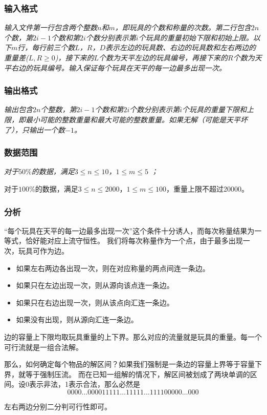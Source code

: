 \subsubsection{输入格式}
{\itshape 
	输入文件第一行包含两个整数$n$和$m$，即玩具的个数和称量的次数。第二行包含$2n$个数，第$2i-1$个数和第$2i$个数分别表示第$i$个玩具的重量初始下限和初始上限。以下$m$行，每行前三个数$L$，$R$，$D$表示左边的玩具数、右边的玩具数和左右两边的重量差($L,R \ge 0$)，接下来的$L$个数为天平左边的玩具编号，再接下来的$R$个数为天平右边的玩具编号。输入保证每个玩具在天平的每一边最多出现一次。
}
\subsubsection{输出格式}
{\itshape 输出包含$2n$个整数，第$2i-1$个数和第$2i$个数分别表示第$i$个玩具的重量下限和上限，即最小可能的整数重量和最大可能的整数重量。如果无解（可能是天平坏了），只输出一个数$-1$。}
\subsubsection{数据范围}
{\itshape
对于$50\%$的数据，满足$3 \le n \le 10$，$1 \le m \le 5$ ；\par
对于$100\%$的数据，满足$3 \le n \le 2000$，$1 \le m \le 100$，重量上限不超过20000。
}
\subsubsection{分析}
“每个玩具在天平的每一边最多出现一次”这个条件十分诱人，而每次称量结果为一等式，恰好能对应上流守恒性。
我们将每次称量作为一个点，由于最多出现一次，玩具可作为边。
\begin{itemize}
\item 如果左右两边各出现一次，则在对应称量的两点间连一条边。
\item 如果只在左边出现一次，则从源向该点连一条边。
\item 如果只在右边出现一次，则从该点向汇连一条边。
\item 如果没有出现，则从源向汇连一条边。
\end{itemize}
\par 边的容量上下限均取玩具重量的上下界。那么对应的流量就是玩具的重量。每一个可行流就是一组合法解。
\par 那么，如何确定每个物品的解区间？如果我们强制是一条边的容量上界等于容量下界，就等于强制压流。
而在已知一组解的情况下，解区间被划成了两块单调的区间。设0表示非法，1表示合法，那么必然是
\begin{displaymath}
0000\ldots000011111\ldots11111\ldots111100000\ldots000
\end{displaymath}
\par 左右两边分别二分判可行性即可。
